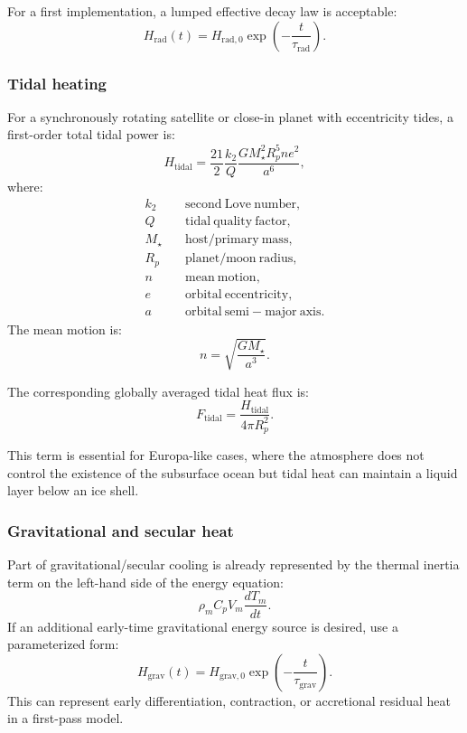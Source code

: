 \documentclass[11pt]{article}
\begin{document}
For a first implementation, a lumped effective decay law is acceptable:
\begin{equation}
    H_{\mathrm{rad}}(t)
    =
    H_{\mathrm{rad},0}\exp\left(-\frac{t}{\tau_{\mathrm{rad}}}\right).
\end{equation}

\subsubsection{Tidal heating}

For a synchronously rotating satellite or close-in planet with eccentricity
tides, a first-order total tidal power is:
\begin{equation}
    H_{\mathrm{tidal}}
    =
    \frac{21}{2}
    \frac{k_2}{Q}
    \frac{
        G M_\star^2 R_p^5 n e^2
    }{
        a^6
    },
\end{equation}
where:
\begin{align}
    k_2 &\quad \mathrm{second\ Love\ number}, \\
    Q &\quad \mathrm{tidal\ quality\ factor}, \\
    M_\star &\quad \mathrm{host/primary\ mass}, \\
    R_p &\quad \mathrm{planet/moon\ radius}, \\
    n &\quad \mathrm{mean\ motion}, \\
    e &\quad \mathrm{orbital\ eccentricity}, \\
    a &\quad \mathrm{orbital\ semi-major\ axis}.
\end{align}
The mean motion is:
\begin{equation}
    n =
    \sqrt{\frac{G M_\star}{a^3}}.
\end{equation}

The corresponding globally averaged tidal heat flux is:
\begin{equation}
    F_{\mathrm{tidal}}
    =
    \frac{H_{\mathrm{tidal}}}{4\pi R_p^2}.
\end{equation}

This term is essential for Europa-like cases, where the atmosphere does not
control the existence of the subsurface ocean but tidal heat can maintain a
liquid layer below an ice shell.

\subsubsection{Gravitational and secular heat}

Part of gravitational/secular cooling is already represented by the thermal
inertia term on the left-hand side of the energy equation:
\begin{equation}
    \rho_m C_p V_m \frac{dT_m}{dt}.
\end{equation}
If an additional early-time gravitational energy source is desired, use a
parameterized form:
\begin{equation}
    H_{\mathrm{grav}}(t)
    =
    H_{\mathrm{grav},0}
    \exp\left(-\frac{t}{\tau_{\mathrm{grav}}}\right).
\end{equation}
This can represent early differentiation, contraction, or accretional residual
heat in a first-pass model.
\end{document}
